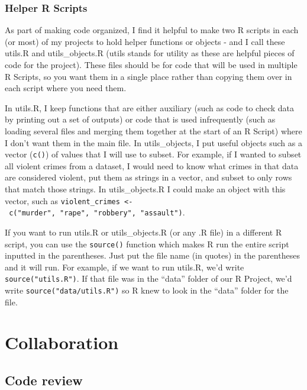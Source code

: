 \documentclass[
]{krantz}
\begin{document}
\hypertarget{helper-r-scripts}{%
\subsection{Helper R Scripts}\label{helper-r-scripts}}

As part of making code organized, I find it helpful to make two R scripts in each (or most) of my projects to hold helper functions or objects - and I call these utils.R and utils\_objects.R (utils stands for utility as these are helpful pieces of code for the project). These files should be for code that will be used in multiple R Scripts, so you want them in a single place rather than copying them over in each script where you need them.

In utils.R, I keep functions that are either auxiliary (such as code to check data by printing out a set of outputs) or code that is used infrequently (such as loading several files and merging them together at the start of an R Script) where I don't want them in the main file. In utils\_objects, I put useful objects such as a vector (\texttt{c()}) of values that I will use to subset. For example, if I wanted to subset all violent crimes from a dataset, I would need to know what crimes in that data are considered violent, put them as strings in a vector, and subset to only rows that match those strings. In utils\_objects.R I could make an object with this vector, such as \texttt{violent\_crimes\ \textless{}-\ c("murder",\ "rape",\ "robbery",\ "assault")}.

If you want to run utils.R or utils\_objects.R (or any .R file) in a different R script, you can use the \texttt{source()} function which makes R run the entire script inputted in the parentheses. Just put the file name (in quotes) in the parentheses and it will run. For example, if we want to run utils.R, we'd write \texttt{source("utils.R")}. If that file was in the ``data'' folder of our R Project, we'd write \texttt{source("data/utils.R")} so R knew to look in the ``data'' folder for the file.

\hypertarget{collaboration}{%
\chapter{Collaboration}\label{collaboration}}

\hypertarget{code-review}{%
\section{Code review}\label{code-review}}
\end{document}
